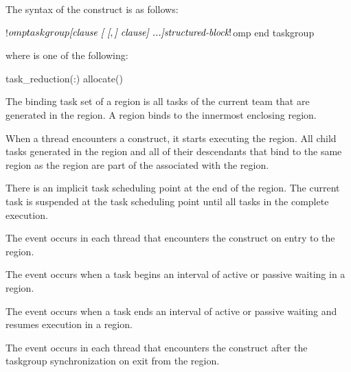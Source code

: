 \begin{fortranspecific}
The syntax of the  construct is as follows:

\begin{ompfPragma}
!$omp taskgroup \plc{[clause [ [},\plc{] clause] ...]}
    \plc{structured-block}
!$omp end taskgroup
\end{ompfPragma}

where  is one of the following:

\begin{indentedcodelist}
task_reduction(:)
allocate(\plc{[allocator: ]})
\end{indentedcodelist}

\end{fortranspecific}

\binding
The binding task set of a  region is all tasks of the 
current team that are generated in the region. A  region 
binds to the innermost enclosing  region.

\descr
When a thread encounters a  construct, it starts executing
the region. All child tasks generated in the  region and all
of their descendants that bind to the same  region as the
 region are part of the  associated with
the  region.

There is an implicit task scheduling point at the end of the 
region. The current task is suspended at the task scheduling point until all
tasks in the  complete execution.

\events

The  event occurs in each thread that encounters the
 construct on entry to the  region.

The  event occurs when a task begins an interval 
of active or passive waiting in a  region.

The  event occurs when a task ends an interval of 
active or passive waiting and resumes execution in a  region.

The  event occurs in each thread that encounters the
 construct after the taskgroup synchronization on exit from the
 region.

\tools

